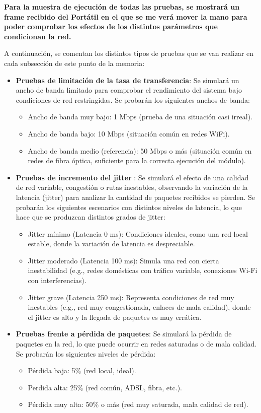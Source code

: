 \textbf{Para la muestra de ejecución de todas las pruebas, se mostrará un frame recibido del Portátil en el que se me verá mover la mano para poder comprobar los efectos de los distintos parámetros que condicionan la red.} 
\vspace{\baselineskip}

A continuación, se comentan los distintos tipos de pruebas que se van realizar en cada subsección de este punto de la memoria:
\begin{itemize}
    \item \textbf{Pruebas de limitación de la tasa de transferencia}: Se simulará un ancho de banda limitado para comprobar el rendimiento del sistema bajo condiciones de red restringidas. Se probarán los siguientes anchos de banda:
    \begin{itemize}
        \item Ancho de banda muy bajo: 1 Mbps (prueba de una situación casi irreal).
        \item Ancho de banda bajo: 10 Mbps (situación común en redes WiFi).
        \item Ancho de banda medio (referencia): 50 Mbps o más (situación común en redes de fibra óptica, suficiente para la correcta ejecución del módulo).
    \end{itemize}
    \item \textbf{Pruebas de incremento del jitter} : Se simulará el efecto de una calidad de red variable, congestión o rutas inestables, observando la variación de la latencia (jitter) para analizar la cantidad de paquetes recibidos se pierden. Se probarán los siguientes escenarios con distintos niveles de latencia, lo que hace que se produzcan distintos grados de jitter:
    \begin{itemize}
      \item Jitter mínimo (Latencia 0 ms): Condiciones ideales, como una red local estable, donde la variación de latencia es despreciable.
      \item Jitter moderado (Latencia 100 ms): Simula una red con cierta inestabilidad (e.g., redes domésticas con tráfico variable, conexiones Wi-Fi con interferencias).
      \item Jitter grave (Latencia 250 ms): Representa condiciones de red muy inestables (e.g., red muy congestionada, enlaces de mala calidad), donde el jitter es alto y la llegada de paquetes es muy errática.
    \end{itemize}
    \item \textbf{Pruebas frente a pérdida de paquetes}: Se simulará la pérdida de paquetes en la red, lo que puede ocurrir en redes saturadas o de mala calidad. Se probarán los siguientes niveles de pérdida: 
    \begin{itemize}
        \item Pérdida baja: 5\% (red local, ideal).
        \item Perdida alta: 25\% (red común, ADSL, fibra, etc.).
        \item Pérdida muy alta: 50\% o más (red muy saturada, mala calidad de red).
    \end{itemize}
\end{itemize}

